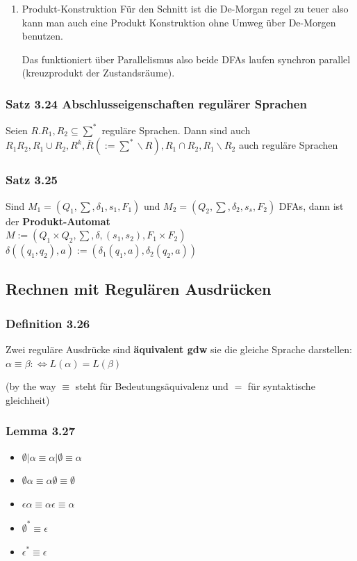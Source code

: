 \documentclass[11pt]{article}
\begin{document}
\begin{enumerate}
\item Produkt-Konstruktion
\label{sec:orgd35e4a0}
Für den Schnitt ist die De-Morgan regel zu teuer also kann man auch eine Produkt Konstruktion ohne Umweg über De-Morgen benutzen.

Das funktioniert über Parallelismus also beide DFAs laufen synchron parallel (kreuzprodukt der Zustandsräume).
\end{enumerate}

\subsubsection{Satz 3.24 Abschlusseigenschaften regulärer Sprachen}
\label{sec:org513caab}
Seien \(R. R_1,R_2 \subseteq \sum^*\) reguläre Sprachen. Dann sind auch
\(R_1R_2, R_1 \cup R_2, R^k, \bar{R} (:= \sum^* \backslash R), R_1 \cap R_2, R_1 \backslash R_2\) auch reguläre Sprachen

\subsubsection{Satz 3.25}
\label{sec:org93db8c1}
Sind \(M_1 = (Q_1, \sum,\delta_1,s_1,F_1)\) und \(M_2 = (Q_2,\sum,\delta_2,s_s, F_2)\) DFAs, dann ist der \textbf{Produkt-Automat}\\
\indent\indent\indent\indent \(M := (Q_1 \times Q_2, \sum, \delta, (s_1,s_2), F_1 \times F_2)\) \\
\indent\indent\indent\indent \(\delta((q_1,q_2), a) := (\delta_1(q_1, a), \delta_2(q_2, a))\)

\subsection{Rechnen mit Regulären Ausdrücken}
\label{sec:org0d3aa47}
\subsubsection{Definition 3.26}
\label{sec:orgba0fd28}
Zwei reguläre Ausdrücke sind \textbf{äquivalent gdw} sie die gleiche Sprache darstellen:
\(\alpha \equiv \beta: \Leftrightarrow L(\alpha) = L(\beta)\)

(by the way \(\equiv\) steht für Bedeutungsäquivalenz und \(=\) für syntaktische gleichheit)

\subsubsection{Lemma 3.27}
\label{sec:orgaaa3ab2}
\begin{itemize}
\item \(\emptyset | \alpha \equiv \alpha | \emptyset \equiv \alpha\)
\item \(\emptyset \alpha \equiv \alpha\emptyset \equiv \emptyset\)
\item \(\epsilon\alpha \equiv \alpha\epsilon \equiv \alpha\)
\item \(\emptyset^* \equiv \epsilon\)
\item \(\epsilon^* \equiv \epsilon\)
\end{itemize}
\end{document}
